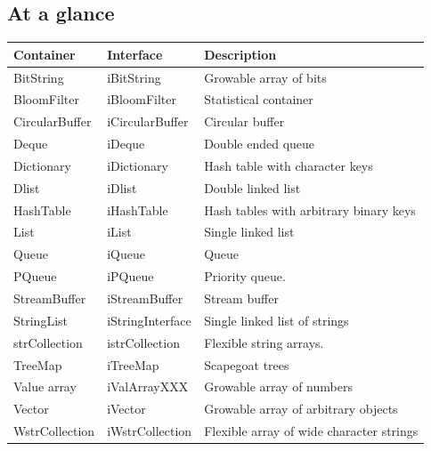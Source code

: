 \documentclass[12pt,a4paper,openany]{memoir} %
\begin{document}
\subsection{At a glance}
{
\begin{center}
\noindent
\begin{longtable}{||p{3cm}|p{3cm}|p{7.0cm}||}
\hline
\textbf{Container}&\textbf{Interface}&\textbf{Description }\\\hline \hline
BitString&iBitString&Growable array of bits \\
BloomFilter&iBloomFilter&Statistical container \\
CircularBuffer&iCircularBuffer& Circular buffer \\
Deque&iDeque&Double ended queue \\
Dictionary&iDictionary&Hash table with character keys \\
Dlist&iDlist&Double linked list \\
HashTable&iHashTable&Hash tables with arbitrary binary keys \\
List&iList&Single linked list \\
Queue&iQueue&Queue \\
PQueue&iPQueue&Priority queue. \\
StreamBuffer&iStreamBuffer&Stream buffer \\
StringList&iStringInterface&Single linked list of strings\\
strCollection&istrCollection&Flexible string arrays. \\
TreeMap&iTreeMap&Scapegoat trees \\
Value array&iValArrayXXX&Growable array of numbers \\
Vector&iVector&Growable array of arbitrary objects \\
WstrCollection&iWstrCollection&Flexible array of wide character strings\\
\hline
\end{longtable}
\end{center}
} %
\end{document}
